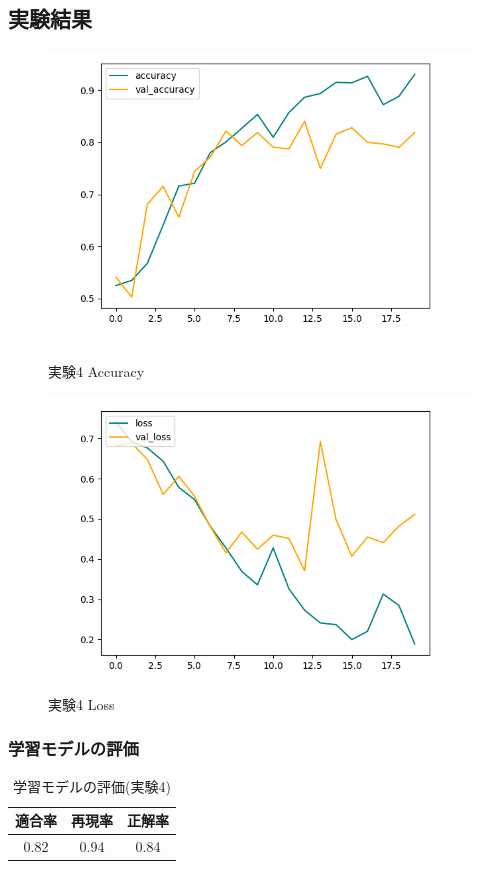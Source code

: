 \documentclass[a4paper, 11pt, titlepage]{jsarticle}
\begin{document}
\subsection{実験結果}
\begin{figure}[htbp]
  \begin{minipage}[b]{0.45\linewidth}
    \centering
    \includegraphics[keepaspectratio, scale=0.435]{ex4_acc.png}
    \caption{実験4 Accuracy}
  \end{minipage}
  \begin{minipage}[b]{0.45\linewidth}
    \centering
    \includegraphics[keepaspectratio, scale=0.435]{ex4_loss.png}
    \caption{実験4 Loss}
  \end{minipage}
\end{figure}

\subsubsection{学習モデルの評価}
\begin{table}[htb]
\centering
  \caption{学習モデルの評価(実験4)}
  \begin{tabular}{|c|c|c|}  \hline
    適合率 & 再現率 & 正解率 \\ \hline
    0.82 & 0.94 & 0.84 \\ \hline
  \end{tabular}
\end{table}
\end{document}
